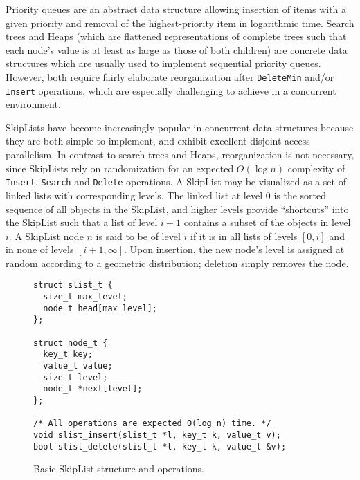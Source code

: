 \documentclass[a4paper,10pt]{article}
\begin{document}

Priority queues are an abstract data structure allowing insertion of items with a given priority
and removal of the highest-priority item in logarithmic time. Search trees and Heaps (which are 
flattened representations of complete trees such that each node's value is at least as large as
those of both children) are concrete data structures which are usually used to implement sequential
priority queues. However, both require fairly elaborate reorganization after \lstinline|DeleteMin|
and/or \lstinline|Insert| operations, which are especially challenging to achieve in a concurrent
environment. 


SkipLists \cite{pugh1990skip} have become increasingly popular in concurrent data structures because 
they are both simple to implement, and exhibit excellent disjoint-access parallelism. In contrast to
search trees and Heaps, reorganization is not necessary, since SkipLists rely on
randomization for an expected $O(\log n)$ complexity of \lstinline|Insert|, \lstinline|Search|
and \lstinline|Delete| operations.
A SkipList may be visualized as a set of linked lists with corresponding levels. The linked
list at level 0 is the sorted sequence of all objects in the SkipList,
and higher levels provide ``shortcuts''
into the SkipList such that a list of level $i + 1$ contains a subset of the objects in level
$i$. A SkipList node $n$ is said to be of level $i$ if it is in all lists of levels $[0, i]$
and in none of levels $[i + 1, \infty]$. Upon insertion, the new node's level is assigned at random
according to a geometric distribution; deletion simply removes the node.


\begin{figure}[ht]
\begin{lstlisting}
struct slist_t {
  size_t max_level;
  node_t head[max_level];
};

struct node_t {
  key_t key;
  value_t value;
  size_t level;
  node_t *next[level];
};

/* All operations are expected O(log n) time. */
void slist_insert(slist_t *l, key_t k, value_t v);
bool slist_delete(slist_t *l, key_t k, value_t &v);
\end{lstlisting}
\caption{Basic SkipList structure and operations.}
\label{fig:basicsl}
\end{figure}
\end{document}
